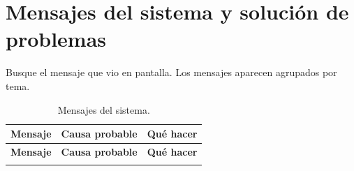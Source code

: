 \chapter{Mensajes del sistema y solución de problemas}\label{cap:mensajes}

Busque el mensaje que vio en pantalla. Los mensajes aparecen agrupados por
tema.

\small
\begin{longtable}{L{5.6cm} L{4.4cm} L{5.4cm}}
  \caption{Mensajes del sistema.}\label{tab:mensajes} \\
  \toprule
  \textbf{Mensaje} & \textbf{Causa probable} & \textbf{Qué hacer} \\
  \midrule
  \endfirsthead
  \toprule
  \textbf{Mensaje} & \textbf{Causa probable} & \textbf{Qué hacer} \\
  \midrule
  \endhead
  \bottomrule
  \endfoot


\end{longtable}
